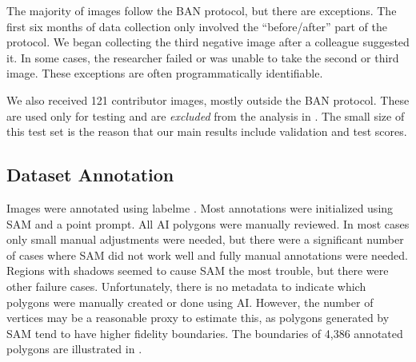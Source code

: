 \documentclass{article}
\begin{document}

The majority of images follow the BAN protocol, but there are exceptions.
The first six months of data collection only involved the ``before/after'' part of the protocol. 
We began collecting the third negative image after a colleague suggested it.
In some cases, the researcher failed or was unable to take the second or third image.
These exceptions are often programmatically identifiable.
  
We also received 121 contributor images, mostly outside the BAN protocol.
These are used only for testing and are \emph{excluded} from the analysis in .
The small size of this test set is the reason that our main results include
validation and test scores.



\subsection{Dataset Annotation}

Images were annotated using labelme \cite{wada_labelmeailabelme_nodate}. 
Most annotations were initialized using SAM and a point prompt. 
All AI polygons were manually reviewed. In most cases only small manual
adjustments were needed, but there were a significant number of cases where SAM
did not work well and fully manual annotations were needed.
Regions with shadows seemed to cause SAM the most trouble, but there were other
failure cases. Unfortunately, there is no metadata to indicate which polygons
were manually created or done using AI.  However, the number of vertices may be
a reasonable proxy to estimate this, as polygons generated by SAM tend to have
higher fidelity boundaries.  
The boundaries of 4,386 annotated polygons are illustrated in .
\end{document}
